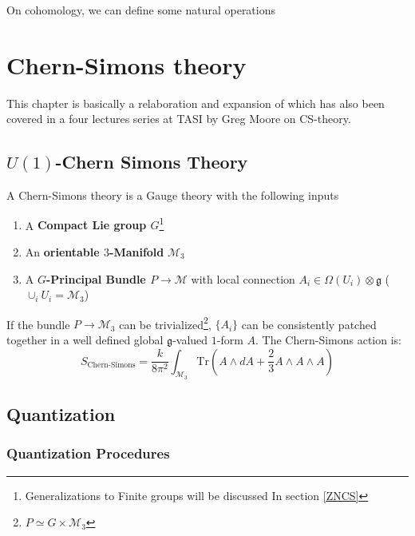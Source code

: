 \documentclass[11pt]{article}
\theoremstyle{definition}
\numberwithin{equation}{section}
\begin{document}
On cohomology, we can define some natural operations
\section{Chern-Simons theory}
This chapter is basically a relaboration and expansion of \cite[Chapter 2]{Moor} which has also been covered in a four lectures series at TASI by Greg Moore on CS-theory. 

\subsection{\texorpdfstring{$U(1)$-Chern Simons Theory}{CS}}
A Chern-Simons theory is a Gauge theory with the following inputs
\begin{enumerate}
    \item A \textbf{Compact Lie group $G$}\footnote{Generalizations to Finite groups will be discussed In section \ref{ZNCS}}
    \item An \textbf{orientable $3$-Manifold} $\mathcal{M}_3$
    \item A \textbf{$G$-Principal Bundle $P \to \mathcal{M}$} with local connection $A_i \in \Omega(U_i) \otimes \mathfrak{g}$ ($\cup_{i} U_i = \mathcal{M}_3$)
\end{enumerate}
If the bundle $P \to \mathcal{M}_3$ can be trivialized\footnote{$P \simeq G \times \mathcal{M}_3$}, $\{A_i\}$ can be consistently patched together in a well defined global $\mathfrak{g}$-valued $1$-form $A$. The Chern-Simons action is:
\begin{equation}
    S_{\text{Chern-Simons}} = \frac{k}{8 \pi^2} \int_{\mathcal{M}_3} \text{Tr}(A \wedge d A + \frac{2}{3} A \wedge A \wedge A)
\end{equation}

\subsection{Quantization}
\subsubsection{Quantization Procedures}
\end{document}
